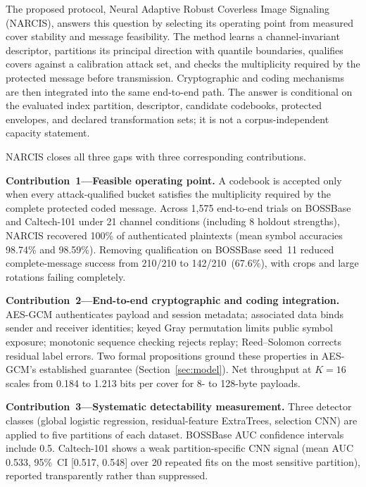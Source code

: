 ﻿\documentclass[a4paper,fleqn]{cas-dc}
\newcommand{\method}{NARCIS\xspace}
\begin{document}
The proposed protocol, Neural Adaptive Robust Coverless Image Signaling
(\method), answers this question by selecting its operating point from
measured cover stability and message feasibility. The method learns a
channel-invariant descriptor, partitions its principal direction with
quantile boundaries, qualifies covers against a calibration attack set, and
checks the multiplicity required by the protected message before transmission.
Cryptographic and coding mechanisms are then integrated into the same
end-to-end path. The answer is conditional on the evaluated index partition,
descriptor, candidate codebooks, protected envelopes, and declared
transformation sets; it is not a corpus-independent capacity statement.

\method closes all three gaps with three corresponding contributions.

\textbf{Contribution~1---Feasible operating point.} A codebook is accepted
only when every attack-qualified bucket satisfies the multiplicity required
by the complete protected coded message. Across 1,575 end-to-end trials on
BOSSBase and Caltech-101 under 21 channel conditions (including 8 holdout
strengths), \method recovered 100\% of authenticated plaintexts (mean symbol
accuracies 98.74\% and 98.59\%). Removing qualification on BOSSBase seed~11
reduced complete-message success from 210/210 to 142/210~(67.6\%), with
crops and large rotations failing completely.

\textbf{Contribution~2---End-to-end cryptographic and coding integration.}
AES-GCM \cite{nist2007gcm} authenticates payload and session metadata;
associated data binds sender and receiver identities; keyed Gray permutation
limits public symbol exposure; monotonic sequence checking rejects replay;
Reed--Solomon \cite{reed1960polynomial} corrects residual label errors. Two
formal propositions ground these properties in AES-GCM's established
guarantee (Section~\ref{sec:model}). Net throughput at $K{=}16$ scales from
0.184 to 1.213 bits per cover for 8- to 128-byte payloads.

\textbf{Contribution~3---Systematic detectability measurement.} Three
detector classes (global logistic regression, residual-feature ExtraTrees,
selection CNN) are applied to five partitions of each dataset. BOSSBase AUC
confidence intervals include 0.5. Caltech-101 shows a weak partition-specific
CNN signal (mean AUC 0.533, 95\%~CI [0.517, 0.548] over 20 repeated fits
on the most sensitive partition), reported transparently rather than
suppressed.
\end{document}
